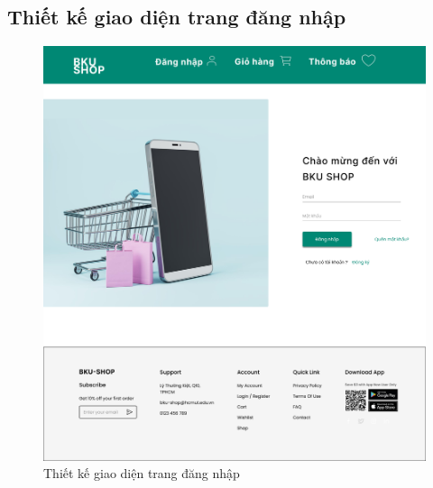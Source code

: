 \subsection {Thiết kế giao diện trang đăng nhập}
\begin{figure}[H]
    \begin{center}
    \includegraphics[scale=0.3]{images/hieu/chap-4/login.jpg}
    \vspace*{5mm}
    \caption{Thiết kế giao diện trang đăng nhập}
    \end{center}
\end{figure}
